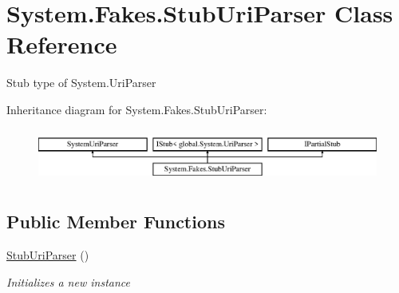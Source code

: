 \hypertarget{class_system_1_1_fakes_1_1_stub_uri_parser}{\section{System.\-Fakes.\-Stub\-Uri\-Parser Class Reference}
\label{class_system_1_1_fakes_1_1_stub_uri_parser}
}


Stub type of System.\-Uri\-Parser 


Inheritance diagram for System.\-Fakes.\-Stub\-Uri\-Parser\-:\begin{figure}[H]
\begin{center}
\leavevmode
\includegraphics[height=1.794872cm]{class_system_1_1_fakes_1_1_stub_uri_parser}
\end{center}
\end{figure}
\subsection*{Public Member Functions}
\begin{DoxyCompactItemize}
\item 
\hyperlink{class_system_1_1_fakes_1_1_stub_uri_parser_a491416d2334a8a794ea11d521a01e166}{Stub\-Uri\-Parser} ()
\begin{DoxyCompactList}\small\item\em Initializes a new instance\end{DoxyCompactList}\end{DoxyCompactItemize}
